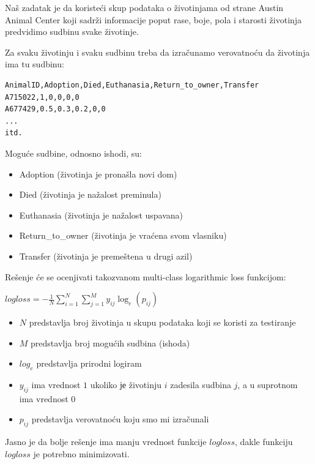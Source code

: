 \documentclass[11pt]{article}
\begin{document}
Naš zadatak je da koristeći skup podataka o životinjama od strane Austin
Animal Center koji sadrži informacije poput rase, boje, pola i starosti
životinja predvidimo sudbinu svake životinje.

Za svaku životinju i svaku sudbinu treba da izračunamo verovatnoću da
životinja ima tu sudbinu:


\begin{verbatim}
AnimalID,Adoption,Died,Euthanasia,Return_to_owner,Transfer
A715022,1,0,0,0,0
A677429,0.5,0.3,0.2,0,0
...
itd.
\end{verbatim}


Moguće sudbine, odnosno ishodi, su:
\begin{itemize}
    \item Adoption (životinja je pronašla
novi dom)
    \item Died (životinja je nažalost preminula) 
    \item Euthanasia (životinja je nažalost uspavana) 
    \item Return\_to\_owner (životinja je vraćena svom vlasniku)
    \item Transfer (životinja je premeštena u drugi azil)
\end{itemize}

Rešenje će se ocenjivati takozvanom multi-class logarithmic loss
funkcijom:

\begin{center}
\(logloss = -\frac{1}{N} \sum_{i=1}^{N} \sum_{j=1}^{M} y_{ij} \log_e{(p_{ij})}\)
\end{center}

\begin{itemize}

\item \(N\) predstavlja broj životinja u skupu podataka koji se koristi za
testiranje
\item \(M\) predstavlja broj mogućih sudbina (ishoda)
\item \(log_e\) predstavlja prirodni logiram
\item \(y_{ij}\) ima vrednost \(1\) ukoliko је životinju \(i\) zadesila
sudbina \(j\), a u suprotnom ima vrednost \(0\)
\item \(p_{ij}\) predstavlja verovatnoću koju smo mi izračunali

\end{itemize}

Jasno je da bolje rešenje ima manju vrednost funkcije \(logloss\), dakle
funkciju \(logloss\) je potrebno minimizovati.
\end{document}
